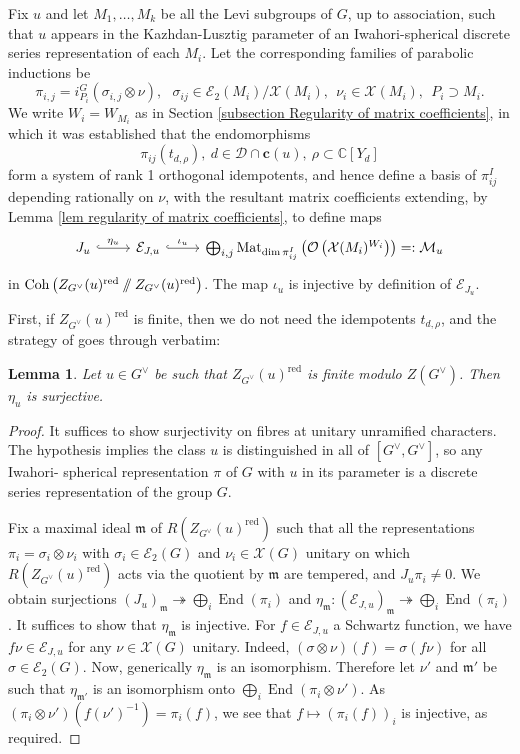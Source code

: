 \documentclass[10pt]{article}
\def\onto{\mathrel{\twoheadrightarrow}}
\DeclareMathOperator{\End}{End}
\DeclareMathOperator{\Mat}{Mat}
\newcommand{\Coh}{\mathrm{Coh}}
\newcommand{\git}{\mathbin{
  \mathchoice{/\mkern-6mu/}%
    {/\mkern-6mu/}%
    {/\mkern-5mu/}%
    {/\mkern-5mu/}}}%
\newcommand{\X}{\mathcal{X}}
\newcommand{\Ee}{\mathcal{E}}
\newcommand{\C}{\mathbb{C}}
\newcommand{\Oo}{\mathcal{O}}
\newcommand{\mM}{\mathfrak{m}}
\newcommand{\cc}{\mathbf{c}}
\newtheorem{lem}{Lemma}
\theoremstyle{definition}
\theoremstyle{remark}
\newcommand{\Gd}{G^\vee}
\newcommand{\Zur}{Z_{G^\vee}(u)^{\mathrm{red}}}
\newcommand{\mMu}{\mathcal{M}_u}
\begin{document}
Fix $u$ and let $M_1,\dots, M_k$ be all the Levi subgroups of $G$, up to association, 
such that $u$ appears in the Kazhdan-Lusztig parameter of an Iwahori-spherical discrete series representation 
of each $M_i$. Let the corresponding families of parabolic inductions be
%
\[
\pi_{i,j}=i_{P_i}^G(\sigma_{i,j}\otimes\nu),~~~\sigma_{ij}\in\mathcal{E}_2(M_i)/\X(M_i),~~\nu_i\in\X(M_i),~~P_i\supset M_i.
\]
%
We write $W_i=W_{M_i}$ as in Section \ref{subsection Regularity of matrix coefficients}, in which it was
established that the endomorphisms
%
\[
\pi_{ij}(t_{d,\rho}),~d\in\mathcal{D}\cap\cc(u),~\rho\subset\C[Y_d]
\]
%
form a system of rank 1 orthogonal idempotents, and hence define a basis of $\pi_{ij}^I$ depending 
rationally on $\nu$, with the resultant matrix coefficients extending, by Lemma \ref{lem regularity of matrix coefficients}, to define maps
%
\begin{equation}
\label{eqn nested modification}
\begin{tikzcd}
J_u\arrow[r, "\eta_u", hook]&\mathcal{E}_{J,u}\arrow[r, "\iota_u", hook]&\bigoplus_{i,j}\Mat_{\dim\pi_{ij}^I}\left(\Oo\left(\X(M_i)^{W_i}\right)\right)=:\mMu
\end{tikzcd}
\end{equation}
%
in $\Coh\left(\Zur\git\Zur\right)$. 
The map $\iota_u$ is injective by definition of $\Ee_{J_u}$. 

First, if $\Zur$ is finite, then we do not need the idempotents $t_{d,\rho}$, and the strategy of 
\cite{BK} goes through verbatim:
%
\begin{lem}
\label{lem surjectivity for finite centralizers}
Let $u\in \Gd$ be such that $\Zur$ is finite modulo $Z(G^\vee)$. Then $\eta_u$ is surjective.
\end{lem}
%
\begin{proof}
It suffices to show surjectivity on fibres at unitary unramified characters.
The hypothesis implies the class $u$ is distinguished in all of $[\Gd,\Gd]$, so any Iwahori-
spherical representation $\pi$ of $G$ with $u$ in its parameter is a discrete series 
representation of the group $G$. 

Fix a maximal ideal
$\mM$ of $R(\Zur)$ such that all the representations $\pi_i=\sigma_i\otimes\nu_i$ with 
$\sigma_i\in\Ee_2(G)$ 
and $\nu_i\in\X(G)$ unitary on which $R(\Zur)$ acts via the quotient by $\mM$ are tempered, and 
$J_u\pi_i\neq 0$. We obtain surjections $(J_u)_\mM\onto\bigoplus_i\End(\pi_i)$ and 
$\eta_\mM\colon(\Ee_{J,u})_\mM\onto\bigoplus_i\End(\pi_i)$.
It suffices to show that $\eta_{\mM}$ is injective.
For $f\in\Ee_{J,u}$ a Schwartz function, we have $f\nu\in\Ee_{J,u}$ for any $\nu\in\X(G)$ unitary.
Indeed, $(\sigma\otimes\nu)(f)=\sigma(f\nu)$ for all $\sigma\in\Ee_2(G)$. Now, generically $\eta_\mM$ is 
an isomorphism. Therefore let $\nu'$ and $\mM'$ be such that $\eta_{\mM'}$ is an isomorphism onto
$\bigoplus_i\End(\pi_i\otimes\nu')$. As $(\pi_i\otimes\nu')(f(\nu')^{-1})=\pi_i(f)$, we see that
$f\mapsto (\pi_i(f))_i$ is injective, as required.
%
\end{proof}
\end{document}
